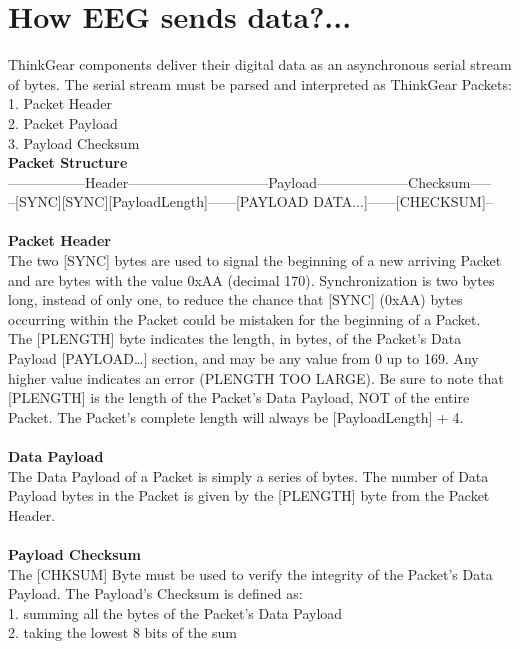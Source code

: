 \documentclass[a4 paper,12pt]{article}
\begin{document}
\begin{minipage}{0.98\textwidth}
	\section{How EEG sends data?...}
	\vspace{-0.1in}
ThinkGear components deliver their digital data as an asynchronous serial stream of bytes. The serial
stream must be parsed and interpreted as ThinkGear Packets:\\1. Packet Header\\2. Packet Payload\\3. Payload Checksum\\\textbf{Packet Structure}\\-----------------Header------------------------------Payload--------------------Checksum-----\\
--[SYNC][SYNC][PayloadLength]------[PAYLOAD DATA...]------[CHECKSUM]--\\\\\textbf{Packet Header}\\
The two [SYNC] bytes are used to signal the beginning of a new arriving Packet and are bytes with
the value 0xAA (decimal 170). Synchronization is two bytes long, instead of only one, to reduce the
chance that [SYNC] (0xAA) bytes occurring within the Packet could be mistaken for the beginning of
a Packet.\\The [PLENGTH] byte indicates the length, in bytes, of the Packet's Data Payload [PAYLOAD…]
section, and may be any value from 0 up to 169. Any higher value indicates an error (PLENGTH TOO
LARGE). Be sure to note that [PLENGTH] is the length of the Packet's Data Payload, NOT of the
entire Packet. The Packet's complete length will always be [PayloadLength] + 4.\\\\
\textbf{Data Payload}\\The Data Payload of a Packet is simply a series of bytes. The number of Data Payload bytes in the
Packet is given by the [PLENGTH] byte from the Packet Header.\\\\\textbf{Payload Checksum}\\The [CHKSUM] Byte must be used to verify the integrity of the Packet's Data Payload. The Payload's
Checksum is defined as:\\
1. summing all the bytes of the Packet's Data Payload\\
2. taking the lowest 8 bits of the sum\\

\end{minipage}
\end{document}
